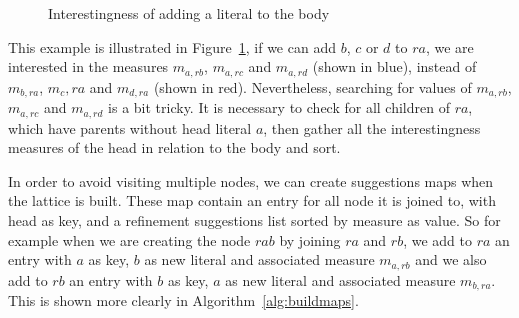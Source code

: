 \begin{figure}[!h]
  \caption{Interestingness of adding a literal to the body}
  \centering
  \label{fig:latticeSuggestion}
\end{figure}

This example is illustrated in Figure~\ref{fig:latticeSuggestion}, if we can add $b$, $c$ or $d$ to $ra$, we are
interested in the measures $m_{a,rb}$, $m_{a,rc}$ and $m_{a,rd}$ (shown in blue), instead of $m_{b,ra}$, $m_c,ra$ and
$m_{d,ra}$ (shown in red). Nevertheless, searching for values of $m_{a,rb}$, $m_{a,rc}$ and $m_{a,rd}$ is a bit tricky.
It is necessary to check for all children of $ra$, which have parents without head literal $a$, then gather all the
interestingness measures of the head in relation to the body and sort.

In order to avoid visiting multiple nodes, we can create suggestions maps when the lattice is built. These map
contain an entry for all node it is joined to, with head as key, and a refinement suggestions list sorted by
measure as value. So for example when we are creating the node $rab$ by joining $ra$ and $rb$, we add to $ra$ an entry
with $a$ as key, $b$ as new literal and  associated measure $m_{a,rb}$ and we also add to $rb$ an entry with $b$ as key,
$a$ as new literal and associated measure $m_{b,ra}$. This is shown more clearly in Algorithm~\ref{alg:buildmaps}.

